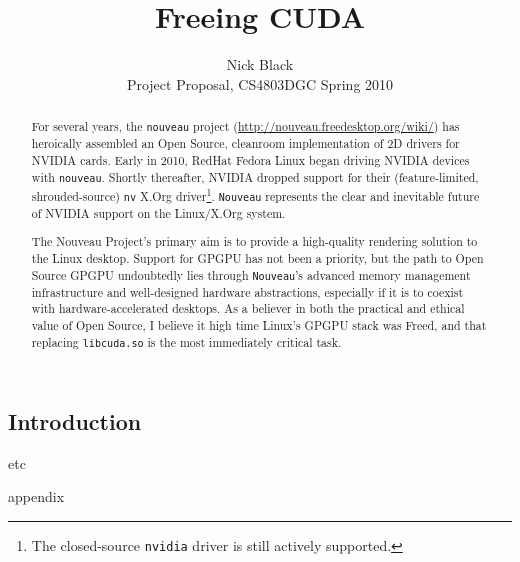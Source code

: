 \documentclass[letterpaper,10pt]{article}
\title{Freeing CUDA}
\author{Nick Black\\
Project Proposal, CS4803DGC Spring 2010}
\date{}
\begin{document}
\maketitle

\begin{abstract}
For several years, the \texttt{nouveau} project (\url{http://nouveau.freedesktop.org/wiki/})
has heroically assembled an Open Source, cleanroom implementation of 2D drivers for
NVIDIA cards\cite{nouveaustatus}. Early in 2010, RedHat Fedora Linux began driving
NVIDIA devices with \texttt{nouveau}. Shortly thereafter, NVIDIA dropped
support for their (feature-limited, shrouded-source) \texttt{nv} X.Org driver\footnote{The
closed-source \texttt{nvidia} driver is still actively supported.}. \texttt{Nouveau} represents
the clear and inevitable future of NVIDIA support on the Linux/X.Org system.

The Nouveau Project's primary aim is to provide a high-quality rendering
solution to the Linux desktop. Support for GPGPU has not been a priority, but
the path to Open Source GPGPU undoubtedly lies through
\texttt{Nouveau}'s advanced memory management infrastructure and well-designed hardware
abstractions, especially if it is to coexist with hardware-accelerated desktops.
As a believer in both the practical and ethical value of Open Source, I believe
it high time Linux's GPGPU stack was Freed, and that replacing \texttt{libcuda.so}
is the most immediately critical task.
\end{abstract}

\begin{multicols}{2}
\section{Introduction}
etc



\end{multicols}
\appendix
appendix
\newpage
\end{document}

